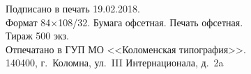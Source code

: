 \vfill
\centering
\begin{minipage}{0.7\tw}
	\small
	\centering
	Подписано в печать 19.02.2018.\\
	Формат 84$\times$108/32. Бумага офсетная. Печать офсетная.\\
	Тираж 500 экз.\\ 
	Отпечатано в ГУП МО <<Коломенская типография>>.\\ 140400, г.~Коломна, ул.~III Интернационала, д.~2a
\end{minipage}